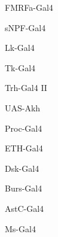 \documentclass[17pt]{extarticle}
\begin{document}
\begin{large}
FMRFa-Gal4 \\[0.5em]
\end{large}
\footnotesize
\newpage\vspace*{-0.15cm}
\begin{large}
sNPF-Gal4 \\[0.5em]
\end{large}
\footnotesize
\newpage\vspace*{-0.15cm}
\begin{large}
Lk-Gal4 \\[0.5em]
\end{large}
\footnotesize
\newpage\vspace*{-0.15cm}
\begin{large}
Tk-Gal4 \\[0.5em]
\end{large}
\footnotesize
\newpage\vspace*{-0.15cm}
\begin{normalsize}
Trh-Gal4 II \\[0.5em]
\end{normalsize}
\footnotesize
\newpage\vspace*{-0.15cm}
\begin{large}
UAS-Akh \\[0.5em]
\end{large}
\footnotesize
\newpage\vspace*{-0.15cm}
\begin{large}
Proc-Gal4 \\[0.5em]
\end{large}
\footnotesize
\newpage\vspace*{-0.15cm}
\begin{large}
ETH-Gal4 \\[0.5em]
\end{large}
\footnotesize
\newpage\vspace*{-0.15cm}
\begin{large}
Dsk-Gal4 \\[0.5em]
\end{large}
\footnotesize
\newpage\vspace*{-0.15cm}
\begin{large}
Burs-Gal4 \\[0.5em]
\end{large}
\footnotesize
\newpage\vspace*{-0.15cm}
\begin{large}
AstC-Gal4 \\[0.5em]
\end{large}
\footnotesize
\newpage\vspace*{-0.15cm}
\begin{large}
Ms-Gal4 \\[0.5em]
\end{large}
\footnotesize
\newpage
\end{document}
